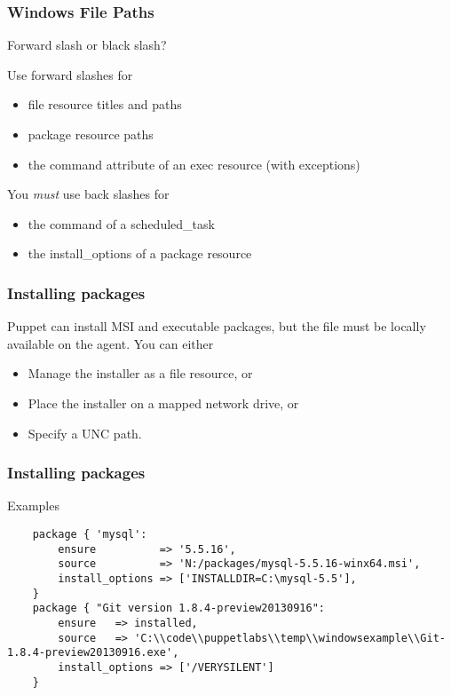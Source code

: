 \documentclass[10pt]{beamer}
\begin{document}
\begin{frame}
  \frametitle{Windows File Paths}
  
Forward slash or black slash?

Use forward slashes for 
\begin{itemize}
\item file resource titles and paths
\item package resource paths
\item the command attribute of an exec resource (with exceptions)
\end{itemize}

You \emph{must} use back slashes for 
\begin{itemize}
\item the command of a scheduled\_task
\item the install\_options of a package resource
\end{itemize}


\end{frame}

\begin{frame}
  \frametitle{Installing packages}
  
Puppet can install MSI and executable packages, but the file must be locally available on the agent.  You can either
\begin{itemize}
\item Manage the installer as a file resource, or
\item Place the installer on a mapped network drive, or
\item Specify a UNC path.
\end{itemize}
\end{frame}
\begin{frame}[fragile]
  \frametitle{Installing packages}
  Examples

  \begin{verbatim}
    package { 'mysql':
        ensure          => '5.5.16',
        source          => 'N:/packages/mysql-5.5.16-winx64.msi',
        install_options => ['INSTALLDIR=C:\mysql-5.5'],
    }
    package { "Git version 1.8.4-preview20130916":
        ensure   => installed,
        source   => 'C:\\code\\puppetlabs\\temp\\windowsexample\\Git-1.8.4-preview20130916.exe',
        install_options => ['/VERYSILENT']
    }
  \end{verbatim}



\end{frame}
\end{document}
